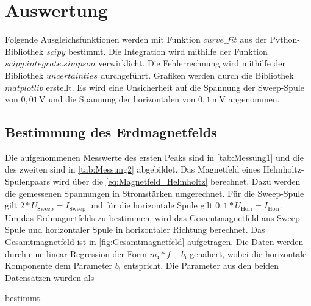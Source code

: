 \section{Auswertung}
\label{sec:auswertung}

Folgende Ausgleichsfunktionen werden mit Funktion $curve\_fit$ aus der Python\cite{py}-Bibliothek $scipy$\cite{2020SciPy-NMeth} bestimmt.
Die Integration wird mithilfe der Funktion $scipy.integrate.simpson$ \cite{2020SciPy-NMeth}verwirklicht.
Die Fehlerrechnung wird mithilfe der Bibliothek $uncertainties$ \cite{unp} durchgeführt.
Grafiken werden durch die Bibliothek $matplotlib$\cite{Hunter:2007} erstellt. 
Es wird eine Unsicherheit auf die Spannung der Sweep-Spule von $0,01 \, \unit{\volt}$ und die Spannung der horizontalen von $0,1 \, \unit{\milli\volt} $ angenommen.

\subsection{Bestimmung des Erdmagnetfelds}

Die aufgenommenen Messwerte des ersten Peaks sind in \autoref{tab:Messung1} und die des zweiten sind in \autoref{tab:Messung2} abgebildet.
Das Magnetfeld eines Helmholtz-Spulenpaars wird über die \eqref{eq:Magnetfeld_Helmholtz} berechnet.
Dazu werden die gemessenen Spannungen in Stromstärken umgerechnet.
Für die Sweep-Spule gilt $2*U_\text{Sweep} = I_\text{Sweep}$ und für die horizontale Spule gilt $0,1*U_\text{Hori} = I_\text{Hori}$.\\
Um das Erdmagnetfelds zu bestimmen, wird das Gesamtmagnetfeld aus Sweep-Spule und horizontaler Spule in horizontaler Richtung berechnet.
Das Gesamtmagnetfeld ist in \autoref{fig:Gesamtmagnetfeld} aufgetragen. 
Die Daten werden durch eine linear Regression der Form $m_\text{i} *f + b_\text{i}$ genähert,
wobei die horizontale Komponente dem Parameter $b_\text{i}$ entspricht.
Die Parameter aus den beiden Datensätzen wurden als 



bestimmt.


